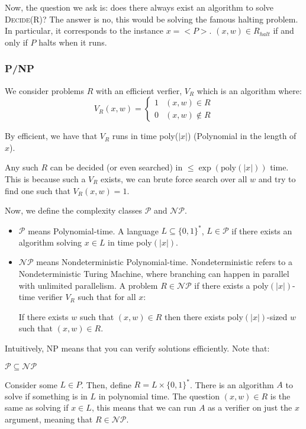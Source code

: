 Now, the question we ask is: does there always exist an algorithm to solve \textsc{Decide(R)}? The answer is no,
this would be solving the famous halting problem. In particular, it corresponds to the instance $x = <P>$. $(x, w) \in R_{halt}$ if
and only if $P$ halts when it runs.

\subsubsection{P/NP}
We consider problems $R$ with an efficient verfier, $V_R$ which is an algorithm where:
\[ V_R(x, w) = \begin{cases}
    1 & (x, w) \in R \\
    0 & (x, w) \notin R
\end{cases} \]

By efficient, we have that $V_R$ runs in time poly($|x|$) (Polynomial in the length of $x$).

\begin{note}
    Any such $R$ can be decided (or even searched) in $\leq \exp(\text{poly}(|x|))$ time.
    This is because such a $V_R$ exists, we can brute force search over all $w$ and try to find one
    such that $V_R(x, w) = 1$.
\end{note}

Now, we define the complexity classes $\mathcal{P}$ and $\mathcal{NP}$.

\begin{definition}
    \begin{itemize}
    \item $\mathcal{P}$ means Polynomial-time.
    A language $L \subseteq \{0, 1\}^*$, $L \in \mathcal{P}$ if there exists an algorithm solving $x \in L$ in time poly$(|x|)$.

    \item $\mathcal{NP}$ means Nondeterministic Polynomial-time. Nondeterministic refers to a Nondeterministic Turing Machine,
    where branching can happen in parallel with unlimited parallelism.
    A problem $R \in \mathcal{NP}$ if there exists a poly$(|x|)$-time verifier $V_R$ such that for all $x$:

    If there exists $w$ such that
    $(x, w) \in R$ then there exists poly$(|x|)$-sized $w$ such that $(x, w) \in R$.
    \end{itemize}
\end{definition}

Intuitively, NP means that you can verify solutions efficiently. Note that:
\begin{theorem}[P in NP]
    $\mathcal{P} \subseteq \mathcal{NP}$

    \begin{proof*}
        Consider some $L \in P$. Then, define $R = L \times \{0, 1\}^*$. There is an algorithm $A$ to solve if something is in $L$ in polynomial time.
        The question $(x, w) \in R$ is the same as solving if $x \in L$, this means that we can run $A$ as a verifier on just the $x$ argument,
        meaning that $R \in \mathcal{NP}$.
    \end{proof*}
\end{theorem}

